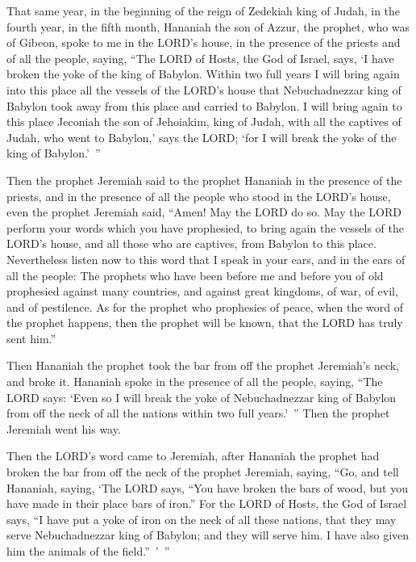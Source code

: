 \mychapter{} \myverse*{}That same year, in the beginning of the reign of Zedekiah king of Judah, in the fourth year, in the fifth month, Hananiah the son of Azzur, the prophet, who was of Gibeon, spoke to me in the LORD’s house, in the presence of the priests and of all the people, saying, \myverse{}“The LORD of Hosts, the God of Israel, says, ‘I have broken the yoke of the king of Babylon. \myverse{}Within two full years I will bring again into this place all the vessels of the LORD’s house that Nebuchadnezzar king of Babylon took away from this place and carried to Babylon. \myverse{}I will bring again to this place Jeconiah the son of Jehoiakim, king of Judah, with all the captives of Judah, who went to Babylon,’ says the LORD; ‘for I will break the yoke of the king of Babylon.’ ”


\myverse{}Then the prophet Jeremiah said to the prophet Hananiah in the presence of the priests, and in the presence of all the people who stood in the LORD’s house, \myverse{}even the prophet Jeremiah said, “Amen! May the LORD do so. May the LORD perform your words which you have prophesied, to bring again the vessels of the LORD’s house, and all those who are captives, from Babylon to this place. \myverse{}Nevertheless listen now to this word that I speak in your ears, and in the ears of all the people: \myverse{}The prophets who have been before me and before you of old prophesied against many countries, and against great kingdoms, of war, of evil, and of pestilence. \myverse{}As for the prophet who prophesies of peace, when the word of the prophet happens, then the prophet will be known, that the LORD has truly sent him.”


\myverse{}Then Hananiah the prophet took the bar from off the prophet Jeremiah’s neck, and broke it. \myverse{}Hananiah spoke in the presence of all the people, saying, “The LORD says: ‘Even so I will break the yoke of Nebuchadnezzar king of Babylon from off the neck of all the nations within two full years.’ ” Then the prophet Jeremiah went his way.


\myverse{}Then the LORD’s word came to Jeremiah, after Hananiah the prophet had broken the bar from off the neck of the prophet Jeremiah, saying, \myverse{}“Go, and tell Hananiah, saying, ‘The LORD says, “You have broken the bars of wood, but you have made in their place bars of iron.” \myverse{}For the LORD of Hosts, the God of Israel says, “I have put a yoke of iron on the neck of all these nations, that they may serve Nebuchadnezzar king of Babylon; and they will serve him. I have also given him the animals of the field.” ’ ”


